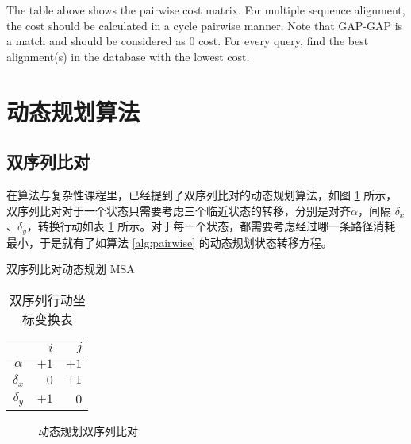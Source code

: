     The table above shows the pairwise cost matrix. For multiple sequence alignment, the cost should be calculated in a cycle pairwise manner. Note that GAP-GAP is a match and should be considered as 0 cost. For every query, find the best alignment(s) in the database with the lowest cost.

    \section{动态规划算法}

    \subsection{双序列比对}

    在算法与复杂性课程\cite{algcom}里，已经提到了双序列比对的动态规划算法，如图 \ref{fig:pairwisedp} 所示，双序列比对对于一个状态只需要考虑三个临近状态的转移，分别是对齐$\alpha$，间隔 $\delta_x$、$\delta_y$，转换行动如表 \ref{tab:pairwise} 所示。对于每一个状态，都需要考虑经过哪一条路径消耗最小，于是就有了如算法 \ref{alg:pairwise} 的动态规划状态转移方程。

    \begin{algorithm}[H]
        \caption{双序列比对动态规划 MSA}\label{alg:pairwise}
        \BlankLine
        \;
    \end{algorithm}

    \begin{minipage}{0.48\textwidth}
        \begin{table}[H]
            \centering
            \caption{双序列行动坐标变换表}\label{tab:pairwise}
            \begin{tabular}{crr}
                \toprule
                    & $i$ & $j$ \\
                \midrule
                $\alpha$ & $+1$ & $+1$ \\
                $\delta_x$ & $0$ & $+1$ \\
                $\delta_y$ & $+1$ & $0$ \\
                \bottomrule
            \end{tabular}
        \end{table}
    \end{minipage}\hfil
    \begin{minipage}{0.48\textwidth}
        \begin{figure}[H]
            \centering
            
            \caption{动态规划双序列比对}\label{fig:pairwisedp}
        \end{figure}
    \end{minipage}
    \medskip
    
